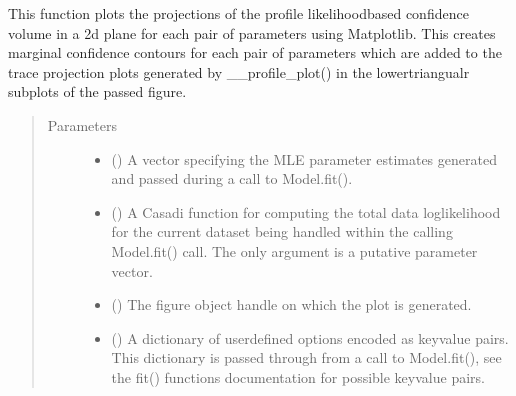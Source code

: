 \documentclass[letterpaper,10pt,english,openany,oneside]{sphinxmanual}
\begin{document}
\begin{fulllineitems}
\begin{fulllineitems}
This function plots the projections of the profile likelihood\sphinxhyphen{}based confidence volume in a
2d plane for each pair of parameters using Matplotlib. This creates marginal confidence
contours for each pair of parameters which are added to the trace projection plots generated
by \_\_profile\_plot() in the lower\sphinxhyphen{}triangualr sub\sphinxhyphen{}plots of the passed figure.
\begin{quote}\begin{description}
\item[{Parameters}] \leavevmode\begin{itemize}
\item {} 
 (\sphinxstyleliteralemphasis{\sphinxupquote{, }}) \textendash{} A vector specifying the MLE parameter estimates generated and
passed during a call to Model.fit().

\item {} 
 () \textendash{} A Casadi function for computing the total data log\sphinxhyphen{}likelihood
for the current dataset being handled within the calling Model.fit() call. The only
argument is a putative parameter vector.

\item {} 
 () \textendash{} The figure object handle on which the plot is generated.

\item {} 
 () \textendash{} A dictionary of user\sphinxhyphen{}defined options encoded as key\sphinxhyphen{}value
pairs. This dictionary is passed through from a call to Model.fit(), see
the fit() functions documentation for possible key\sphinxhyphen{}value pairs.

\end{itemize}

\end{description}\end{quote}

\end{fulllineitems}



\end{fulllineitems}
\end{document}
